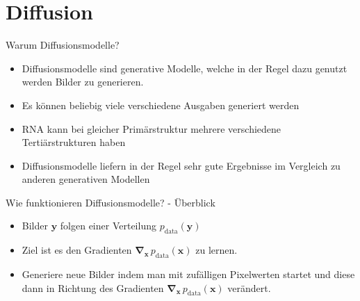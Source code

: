 \section{Diffusion}
\begin{frame}{Warum Diffusionsmodelle?}
	\begin{itemize}
	\item Diffusionsmodelle sind generative Modelle, welche in der Regel dazu genutzt werden Bilder zu generieren.
	\item Es können beliebig viele verschiedene Ausgaben generiert werden
	\item RNA kann bei gleicher Primärstruktur mehrere verschiedene Tertiärstrukturen haben
	\item Diffusionsmodelle liefern in der Regel sehr gute Ergebnisse im Vergleich zu anderen generativen Modellen
	\end{itemize}
\end{frame}

\begin{frame}{Wie funktionieren Diffusionsmodelle? - Überblick}
	\begin{itemize}
		\item Bilder $\boldsymbol y$ folgen einer Verteilung $p_{\text{data}}(\boldsymbol y)$
		\item Ziel ist es den Gradienten $\boldsymbol \nabla_{\boldsymbol x} \, p_\text{data}(\boldsymbol x)$ zu lernen.
		\item Generiere neue Bilder indem man mit zufälligen Pixelwerten startet und diese dann in Richtung des Gradienten $\boldsymbol \nabla_{\boldsymbol x} \, p_\text{data}(\boldsymbol x)$ verändert.
	\end{itemize}
\end{frame}

